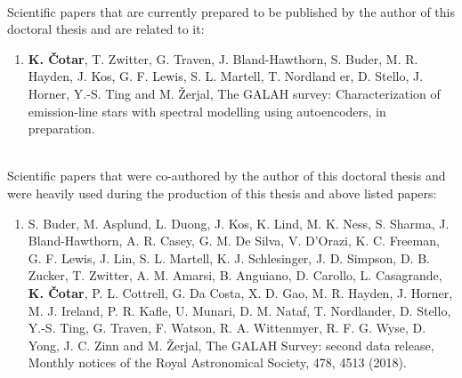 \ \\ 
\noindent
Scientific papers that are currently prepared to be published by the author of this doctoral thesis and are related to it:
\begin{enumerate}
	\item{\textbf{K. Čotar}, T. Zwitter, G. Traven, J. Bland-Hawthorn, S. Buder, M. R. Hayden, J. Kos, G. F. Lewis, S. L. Martell, T. Nordland er, D. Stello, J. Horner, Y.-S. Ting and M. Žerjal, The GALAH survey: Characterization of emission-line stars with spectral modelling using autoencoders, in preparation.}
\end{enumerate}

\ \\ 
\noindent
Scientific papers that were co-authored by the author of this doctoral thesis and were heavily used during the production of this thesis and above listed papers:
\begin{enumerate}
	\item{S. Buder, M. Asplund, L. Duong, J. Kos, K. Lind, M. K. Ness, S. Sharma, J. Bland-Hawthorn, A. R. Casey, G. M. De Silva, V. D’Orazi, K. C. Freeman, G. F. Lewis, J. Lin, S. L. Martell, K. J. Schlesinger, J. D. Simpson, D. B. Zucker, T. Zwitter, A. M. Amarsi, B. Anguiano, D. Carollo, L. Casagrande, \textbf{K. Čotar}, P. L. Cottrell, G. Da Costa, X. D. Gao, M. R. Hayden, J. Horner, M. J. Ireland, P. R. Kafle, U. Munari, D. M. Nataf, T. Nordlander, D. Stello, Y.-S. Ting, G. Traven, F. Watson, R. A. Wittenmyer, R. F. G. Wyse, D. Yong, J. C. Zinn and M. Žerjal, The GALAH Survey: second data release, Monthly notices of the Royal Astronomical Society, 478, 4513 (2018).}
\end{enumerate}

